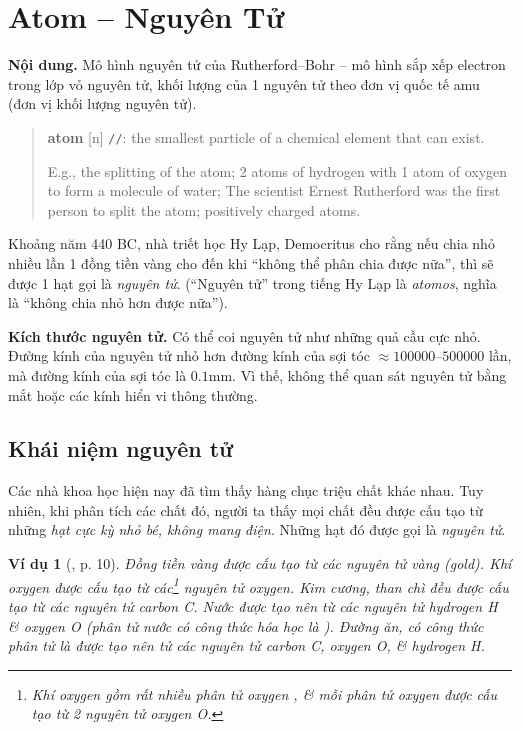\documentclass{article}
\newtheorem{vidu}{Ví dụ}
\begin{document}
\section{Atom -- Nguyên Tử}
\textsf{\textbf{Nội dung.} Mô hình nguyên tử của Rutherford--Bohr -- mô hình sắp xếp electron trong lớp vỏ nguyên tử, khối lượng của 1 nguyên tử theo đơn vị quốc tế amu (đơn vị khối lượng nguyên tử).}
\begin{quotation}
	\textbf{atom} [n] \texttt{/}\texttt{/}: the smallest particle of a chemical element that can exist.
	
	E.g., the splitting of the atom; 2 atoms of hydrogen with 1 atom of oxygen to form a molecule of water; The scientist Ernest Rutherford was the first person to split the atom; positively charged atoms.
\end{quotation}
Khoảng năm 440 BC, nhà triết học Hy Lạp, Democritus cho rằng nếu chia nhỏ nhiều lần 1 đồng tiền vàng cho đến khi ``không thể phân chia được nữa'', thì sẽ được 1 hạt gọi là \textit{nguyên tử}. (``Nguyên tử'' trong tiếng Hy Lạp là \textit{atomos}, nghĩa là ``không chia nhỏ hơn được nữa'').

\textbf{Kích thước nguyên tử.} Có thể coi nguyên tử như những quả cầu cực nhỏ. Đường kính của nguyên tử nhỏ hơn đường kính của sợi tóc $\approx100000$--$500000$ lần, mà đường kính của sợi tóc là $0.1$mm. Vì thế, không thể quan sát nguyên tử bằng mắt hoặc các kính hiển vi thông thường.

\subsection{Khái niệm nguyên tử}
Các nhà khoa học hiện nay đã tìm thấy hàng chục triệu chất khác nhau. Tuy nhiên, khi phân tích các chất đó, người ta thấy mọi chất đều được cấu tạo từ những \textit{hạt cực kỳ nhỏ bé, không mang điện}. Những hạt đó được gọi là \textit{nguyên tử}.

\begin{vidu}[\cite{SGK_KHTN_7_Canh_Dieu}, p. 10]
	Đồng tiền vàng được cấu tạo từ các nguyên tử \emph{vàng (gold)}. Khí oxygen \emph{} được cấu tạo từ các\footnote{Khí oxygen gồm rất nhiều phân tử oxygen , \& mỗi phân tử  oxygen được cấu tạo từ 2 nguyên tử oxygen O.} nguyên tử oxygen. Kim cương, than chì đều được cấu tạo từ các nguyên tử carbon \emph{C}. Nước được tạo nên từ các nguyên tử hydrogen \emph{H} \& oxygen \emph{O} (phân tử nước có công thức hóa học là \emph{}). Đường ăn, có công thức phân tử là \emph{} được tạo nên tử các nguyên tử carbon \emph{C}, oxygen \emph{O}, \& hydrogen \emph{H}.
\end{vidu}
\end{document}
